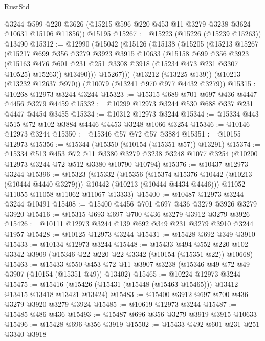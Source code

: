 \begin{lexlean}{RustStd}
\begin{coremodule}
{\begin{coremodule}
{{{{{{{{{{{{{{{{{{{{{{{{{{      @3244
      @599
      @220
      @3626
      (@15215 @596 @220 @453 @11 @3279 @3238 @3624 @10631 @15106 @11856))
    @15195
@15267 := @15223 (@15226 (@15239 @15263)) @13490
@15312 := @12990
    (@15042
      (@15126
        (@15138
          (@15205
            (@15213
              @15267
              (@15217
                @699
                @356
                @3279
                @3923
                @3915
                @10633
                (@15158
                  @699
                  @356
                  @3923
                  (@15163 @476 @601 @231 @251 @3308 @3918 (@15234 @473 @231 @3307 @10525) @15263))
                @13490)))
          @15267)))
    (@13212 (@13225 @139))
    (@10213 (@13232 @12637 @970))
    (@10079 (@13241 @970 @977 @4432 @3279))
@15315 := @10268 @12973 @3244 @3244
@15323 := @15315 @689 @701 @697 @436 @4447 @4456 @3279 @4459
@15332 := @10299 @12973 @3244 @530 @688 @337 @231 @4447 @4454 @3455
@15334 := @10312 @12973 @3244
@15344 := @15334 @443 @515 @72 @102 @3884 @4446 @4453 @3248 @1066 @3254
@15346 := @10146 @12973 @3244
@15350 := @15346 @57 @72 @57 @3884
@15351 := @10155 @12973
@15356 := @15344 (@15350 (@10154 (@15351 @57)) @13291)
@15374 := @15334
    @513
    @453
    @72
    @11
    @3380
    @3279
    @3238
    @3248
    @1077
    @3254
    (@10200 @12973 @3244 @72 @512 @3380 @10790 @10794)
@15376 := @10437 @12973 @3244
@15396 := @15323
    (@15332
      (@15356
        (@15374 @15376 @10442 (@10213 (@10444 @4440 @3279)))
        @10442
        (@10213 (@10444 @4434 @4446)))
      @11052
      @11055
      @11058
      @11062
      @11067
      @13333)
@15400 := @10487 @12973 @3244 @3244 @10491
@15408 := @15400 @4456 @701 @697 @436 @3279 @3926 @3279 @3920
@15416 := @15315 @693 @697 @700 @436 @3279 @3912 @3279 @3926
@15426 := @10111 @12973 @3244 @139 @692 @349 @231 @3279 @3910 @3244 @1957
@15428 := @10125 @12973 @3244
@15431 := @15428 @692 @349 @3910
@15433 := @10134 @12973 @3244
@15448 := @15433
    @494
    @552
    @220
    @102
    @3342
    @3909
    (@15346 @22 @220 @22 @3342 (@10154 (@15351 @22)) @10668)
@15463 := @15433
    @550
    @453
    @72
    @11
    @3907
    @3238
    (@15346 @49 @72 @49 @3907 (@10154 (@15351 @49)) @13402)
@15465 := @10224 @12973 @3244
@15475 := @15416 (@15426 (@15431 (@15448 (@15463 @15465))) @13412 @13415 @13418 @13421 @13424)
@15483 := @15400 @3912 @697 @700 @436 @3279 @3920 @3279 @3924
@15485 := @10619 @12973 @3244
@15487 := @15485 @486 @436
@15493 := @15487 @696 @356 @3279 @3919 @3915 @10633
@15496 := @15428 @696 @356 @3919
@15502 := @15433 @492 @601 @231 @251 @3340 @3918
}}}}}}}}}}}}}}}}}}}}}}}}}}
\end{coremodule}}
\end{coremodule}
\end{lexlean}
